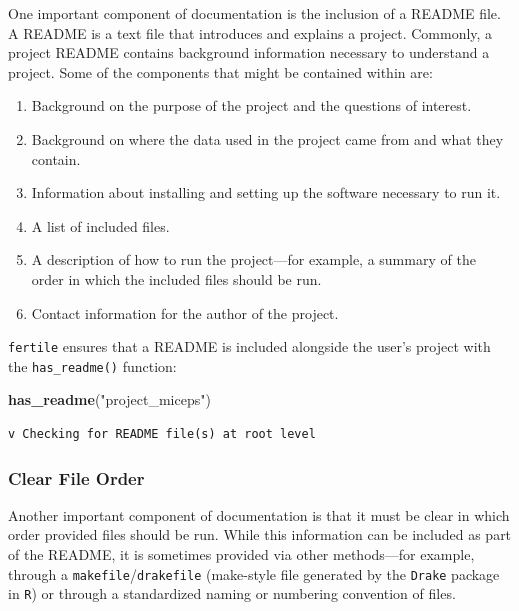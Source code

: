 \documentclass[12pt,twoside]{reedthesis}
\newenvironment{Shaded}{\begin{snugshade}}{\end{snugshade}}
\newcommand{\KeywordTok}[1]{\textcolor[rgb]{0.13,0.29,0.53}{\textbf{#1}}}
\newcommand{\NormalTok}[1]{#1}
\newcommand{\StringTok}[1]{\textcolor[rgb]{0.31,0.60,0.02}{#1}}
\providecommand{\tightlist}{%
  \setlength{\itemsep}{0pt}\setlength{\parskip}{0pt}}
\begin{document}
One important component of documentation is the inclusion of a README file. A README is a text file that introduces and explains a project. Commonly, a project README contains background information necessary to understand a project. Some of the components that might be contained within are:
\begin{enumerate}
\def\labelenumi{\arabic{enumi}.}
\tightlist
\item
  Background on the purpose of the project and the questions of interest.
\item
  Background on where the data used in the project came from and what they contain.
\item
  Information about installing and setting up the software necessary to run it.
\item
  A list of included files.
\item
  A description of how to run the project---for example, a summary of the order in which the included files should be run.
\item
  Contact information for the author of the project.
\end{enumerate}
\texttt{fertile} ensures that a README is included alongside the user's project with the \texttt{has\_readme()} function:
\begin{Shaded}
\begin{Highlighting}[]
\KeywordTok{has_readme}\NormalTok{(}\StringTok{"project_miceps"}\NormalTok{)}
\end{Highlighting}
\end{Shaded}
\begin{verbatim}
v Checking for README file(s) at root level
\end{verbatim}
\hypertarget{clear-file-order}{%
\subsubsection{Clear File Order}\label{clear-file-order}}

Another important component of documentation is that it must be clear in which order provided files should be run. While this information can be included as part of the README, it is sometimes provided via other methods---for example, through a \texttt{makefile}/\texttt{drakefile} (make-style file generated by the \texttt{Drake} package in \texttt{R}) or through a standardized naming or numbering convention of files.
\end{document}
